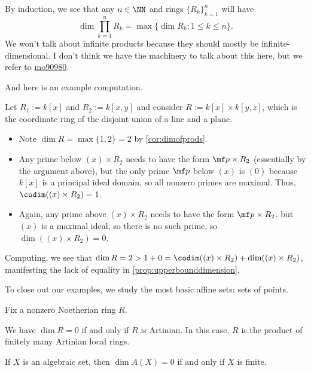 \begin{remark}
	By induction, we see that any $n\in\NN$ and rings $\{R_k\}_{k=1}^n$ will have
	\[\dim\prod_{k=1}^nR_k=\max\{\dim R_k:1\le k\le n\}.\]
	We won't talk about infinite products because they should mostly be infinite-dimensional. I don't think we have the machinery to talk about this here, but we refer to \href{https://mathoverflow.net/q/90980/473811}{mo90980}.
\end{remark}
And here is an example computation.
\begin{example}
	Let $R_1:=k[x]$ and $R_2:=k[x,y]$ and consider $R:=k[x]\times k[y,z]$, which is the coordinate ring of the disjoint union of a line and a plane.
	\begin{itemize}
		\item Note $\dim R=\max\{1,2\}=2$ by \autoref{cor:dimofprods}.
		\item Any prime below $(x)\times R_2$ needs to have the form $\mf p\times R_2$ (essentially by the argument above), but the only prime $\mf p$ below $(x)$ is $(0)$ because $k[x]$ is a principal ideal domain, so all nonzero primes are maximal. Thus, $\codim((x)\times R_2)=1$.
		\item Again, any prime above $(x)\times R_2$ needs to have the form $\mf p\times R_2$, but $(x)$ is a maximal ideal, so there is no such prime, so $\dim((x)\times R_2)=0$.
	\end{itemize}
	Computing, we see that $\dim R=2>1+0=\codim((x)\times R_2)+\dim((x)\times R_2)$, manifesting the lack of equality in \autoref{prop:upperbounddimension}.
\end{example}
To close out our examples, we study the most basic affine sets: sets of points.
\begin{proposition} \label{prop:dimenzionzero}
	Fix a nonzero Noetherian ring $R$.
	\begin{listalph}
		\item We have $\dim R=0$ if and only if $R$ is Artinian. In this case, $R$ is the product of finitely many Artinian local rings.
		\item If $X$ is an algebraic set, then $\dim A(X)=0$ if and only if $X$ is finite.
	\end{listalph}
\end{proposition}
